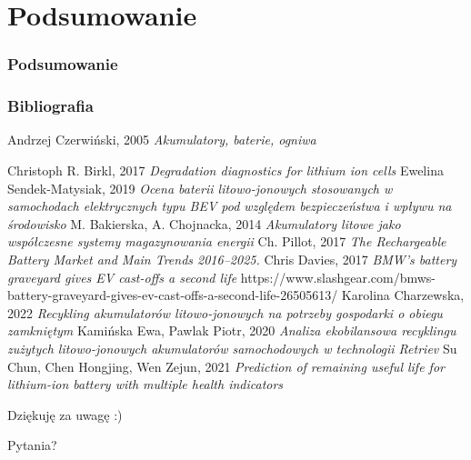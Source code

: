 \documentclass[
	11pt, %
]{beamer}
\begin{document}
\section{Podsumowanie}

\begin{frame}
	\frametitle{Podsumowanie}

\end{frame}

\begin{frame} %
	\frametitle{Bibliografia}
	
	\begin{thebibliography}{99} %
	\tiny	
			Andrzej Czerwiński, 2005
			\newblock \emph{Akumulatory, baterie, ogniwa}
			
			Christoph R. Birkl, 2017
			\newblock \emph{Degradation diagnostics for lithium ion cells}
			Ewelina Sendek-Matysiak, 2019
			\newblock \emph{ Ocena baterii litowo-jonowych stosowanych w samochodach elektrycznych typu BEV pod względem bezpieczeństwa i wpływu na środowisko }
			M. Bakierska, A. Chojnacka, 2014
			\newblock \emph{Akumulatory litowe jako współczesne systemy magazynowania energii}
			Ch. Pillot, 2017
			\newblock \emph{The Rechargeable Battery Market and Main Trends 2016–2025.}
			Chris Davies, 2017
			\newblock \emph{BMW's battery graveyard gives EV cast-offs a second life}
			https://www.slashgear.com/bmws-battery-graveyard-gives-ev-cast-offs-a-second-life-26505613/
			Karolina Charzewska, 2022
			\newblock \emph{ Recykling akumulatorów litowo-jonowych na potrzeby gospodarki o obiegu zamkniętym }
			Kamińska Ewa, Pawlak Piotr, 2020
			\newblock \emph{ Analiza ekobilansowa recyklingu zużytych litowo-jonowych akumulatorów samochodowych w technologii Retriev }
			Su Chun, Chen Hongjing, Wen Zejun, 2021
			\newblock \emph{Prediction of remaining useful life for lithium-ion battery with multiple health indicators}
	\end{thebibliography}
\end{frame}


\begin{frame}[plain] %
	\begin{center}
		{\Huge Dziękuję za uwagę :)}
		
		\bigskip\bigskip %
		
		{\LARGE Pytania?}
	\end{center}
\end{frame}

\end{document}
